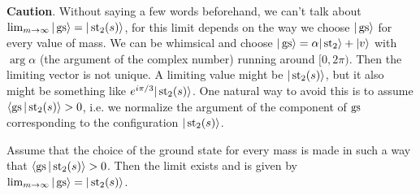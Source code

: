 \noindent \textbf{Caution}. Without saying a few words beforehand, we can't talk about $\lim_{m\rightarrow \infty} |\operatorname{gs}\rangle = |\operatorname{st}_2(s)\rangle$, for this limit depends on the way we choose $|\operatorname{gs}\rangle$ for every value of mass. We can be whimsical and choose $|\operatorname{gs} \rangle = \alpha |\operatorname{st}_2\rangle + |v\rangle$ with $\arg \alpha$ (the argument of the complex number) running around $[0,2\pi)$. Then the limiting vector is not unique. A limiting value might be $|\operatorname{st}_2(s)\rangle$, but it also might be something like $e^{i\pi/3} |\operatorname{st}_2(s)\rangle$. One natural way to avoid this is to assume $\langle \operatorname{gs} | \operatorname{st}_2(s) \rangle > 0$, i.e. we normalize the argument of the component of $\operatorname{gs}$ corresponding to the configuration $|\operatorname{st}_2(s)\rangle$.


\begin{proposition}
Assume that the choice of the ground state for every mass is made in such a way that $\langle \operatorname{gs}|\operatorname{st}_2(s)\rangle > 0$. Then
the limit exists and is given by $\lim_{m\rightarrow \infty} |\operatorname{gs}\rangle = |\operatorname{st}_2(s)\rangle$.
\end{proposition}
